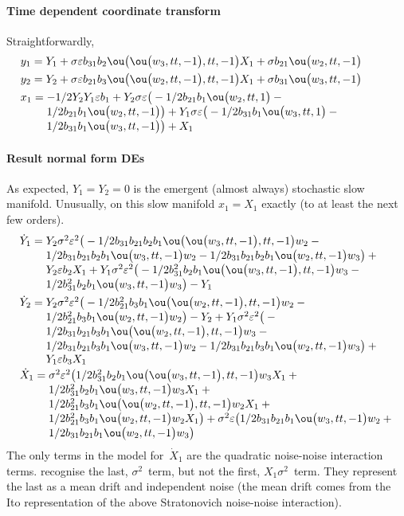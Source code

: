 \paragraph{Time dependent coordinate transform}  Straightforwardly,
\begin{align*}&
y_{1}=Y_{1}+\sigma  \eps b_{31} b_{2} \ou\big(\ou\big(w_{3},tt,-1\big),
tt,-1\big) X_{1}+\sigma  b_{21} \ou\big(w_{2},tt,-1\big)
\\&
y_{2}=Y_{2}+\sigma  \eps b_{21} b_{3} \ou\big(\ou\big(w_{2},tt,-1\big),
tt,-1\big) X_{1}+\sigma  b_{31} \ou\big(w_{3},tt,-1\big)
\\&
x_{1}=\ParMath{ -1/2 Y_{2} Y_{1} \eps b_{1}+Y_{2} \sigma  \eps \big(-1/2 b_{21} b_
{1} \ou\big(w_{2},tt,1\big)-1/2 b_{21} b_{1} \ou\big(w_{2},tt,-1\big)
\big)+Y_{1} \sigma  \eps \big(-1/2 b_{31} b_{1} \ou\big(w_{3},tt,1\big)-
1/2 b_{31} b_{1} \ou\big(w_{3},tt,-1\big)\big)+X_{1}
}
\end{align*}

\paragraph{Result normal form DEs}
As expected, \(Y_1=Y_2=0\) is the emergent (almost always) stochastic slow manifold.  Unusually, on this slow manifold \(x_1=X_1\) exactly (to at least the next few orders).
\begin{align*}&
\dot Y_{1}=\ParMath{ Y_{2} \sigma ^{2} \eps^{2} \big(-1/2 b_{31} b_{21} b_{2} b_{1
} \ou\big(\ou\big(w_{3},tt,-1\big),tt,-1\big) w_{2}-1/2 b_{31} b_{21} b_
{2} b_{1} \ou\big(w_{3},tt,-1\big) w_{2}-1/2 b_{31} b_{21} b_{2} b_{1} 
\ou\big(w_{2},tt,-1\big) w_{3}\big)+Y_{2} \eps b_{2} X_{1}+Y_{1} \sigma 
^{2} \eps^{2} \big(-1/2 b_{31}^{2} b_{2} b_{1} \ou\big(\ou\big(w_{3},tt,
-1\big),tt,-1\big) w_{3}-1/2 b_{31}^{2} b_{2} b_{1} \ou\big(w_{3},tt,-1
\big) w_{3}\big)-Y_{1}
}
\\&
\dot Y_{2}=\ParMath{ Y_{2} \sigma ^{2} \eps^{2} \big(-1/2 b_{21}^{2} b_{3} b_{1} 
\ou\big(\ou\big(w_{2},tt,-1\big),tt,-1\big) w_{2}-1/2 b_{21}^{2} b_{3} b
_{1} \ou\big(w_{2},tt,-1\big) w_{2}\big)-Y_{2}+Y_{1} \sigma ^{2} \eps^{2
} \big(-1/2 b_{31} b_{21} b_{3} b_{1} \ou\big(\ou\big(w_{2},tt,-1\big),
tt,-1\big) w_{3}-1/2 b_{31} b_{21} b_{3} b_{1} \ou\big(w_{3},tt,-1\big) 
w_{2}-1/2 b_{31} b_{21} b_{3} b_{1} \ou\big(w_{2},tt,-1\big) w_{3}\big)+
Y_{1} \eps b_{3} X_{1}
}
\\&
\dot X_{1}=\ParMath{ \sigma ^{2} \eps^{2} \big(1/2 b_{31}^{2} b_{2} b_{1} \ou\big(
\ou\big(w_{3},tt,-1\big),tt,-1\big) w_{3} X_{1}+1/2 b_{31}^{2} b_{2} b_{
1} \ou\big(w_{3},tt,-1\big) w_{3} X_{1}+1/2 b_{21}^{2} b_{3} b_{1} \ou
\big(\ou\big(w_{2},tt,-1\big),tt,-1\big) w_{2} X_{1}+1/2 b_{21}^{2} b_{3
} b_{1} \ou\big(w_{2},tt,-1\big) w_{2} X_{1}\big)+\sigma ^{2} \eps \big(
1/2 b_{31} b_{21} b_{1} \ou\big(w_{3},tt,-1\big) w_{2}+1/2 b_{31} b_{21}
 b_{1} \ou\big(w_{2},tt,-1\big) w_{3}\big)
}
\end{align*}
The only terms in the model for~\(\dot X_1\) are the quadratic noise-noise interaction terms. \cite{Majda02} recognise the last, $\sigma^2$~term, but not the first, $X_1\sigma^2$~term.
They represent the last as a mean drift and independent noise (the mean drift comes from the Ito representation of the above Stratonovich noise-noise interaction).
